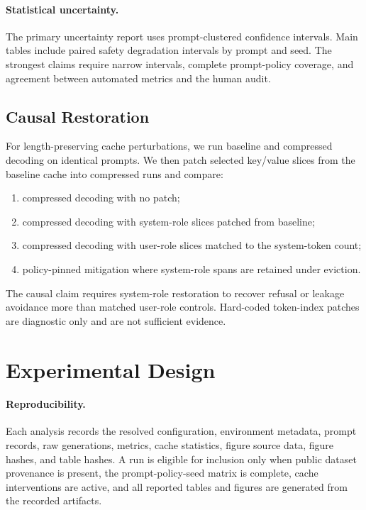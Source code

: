 \documentclass[11pt]{article}
\begin{document}
\paragraph{Statistical uncertainty.}
The primary uncertainty report uses prompt-clustered confidence intervals. Main tables include paired safety degradation intervals by prompt and seed. The strongest claims require narrow intervals, complete prompt-policy coverage, and agreement between automated metrics and the human audit.

\subsection{Causal Restoration}

For length-preserving cache perturbations, we run baseline and compressed decoding on identical prompts. We then patch selected key/value slices from the baseline cache into compressed runs and compare:
\begin{enumerate}
  \item compressed decoding with no patch;
  \item compressed decoding with system-role slices patched from baseline;
  \item compressed decoding with user-role slices matched to the system-token count;
  \item policy-pinned mitigation where system-role spans are retained under eviction.
\end{enumerate}

The causal claim requires system-role restoration to recover refusal or leakage avoidance more than matched user-role controls. Hard-coded token-index patches are diagnostic only and are not sufficient evidence.

\section{Experimental Design}

\paragraph{Reproducibility.}
Each analysis records the resolved configuration, environment metadata, prompt records, raw generations, metrics, cache statistics, figure source data, figure hashes, and table hashes. A run is eligible for inclusion only when public dataset provenance is present, the prompt-policy-seed matrix is complete, cache interventions are active, and all reported tables and figures are generated from the recorded artifacts.
\end{document}
